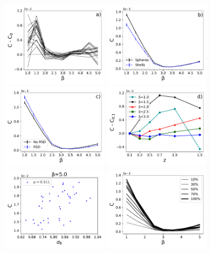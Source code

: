 \documentclass[fleqn,usenatbib]{mnras}
\begin{document}
\begin{figure}
    \centering
    \includegraphics[width=0.4\textwidth]{varianza.pdf}
    \includegraphics[width=0.4\textwidth]{geometria.pdf}
    \includegraphics[width=0.4\textwidth]{rsd.pdf}
    \includegraphics[width=0.4\textwidth]{rsd_evolution.pdf}
    \includegraphics[width=0.4\textwidth]{cvsigma8.pdf}
    \includegraphics[width=0.4\textwidth]{cvb_porc.pdf}

\end{figure}
\end{document}
